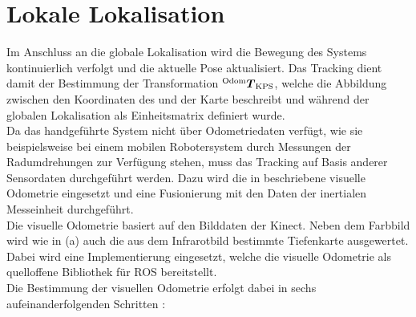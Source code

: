 \section{Lokale Lokalisation}
\label{locloc}
Im Anschluss an die globale Lokalisation wird die Bewegung des Systems kontinuierlich verfolgt und die aktuelle Pose aktualisiert. Das Tracking dient damit der Bestimmung der Transformation ${^{\mathrm{Odom}}\mbox{\boldmath{$T$}}_{\mathrm{KPS}}}$, welche die Abbildung zwischen den Koordinaten des  und der Karte beschreibt und während der globalen Lokalisation als Einheitsmatrix definiert wurde.\\

Da das handgeführte System nicht über Odometriedaten verfügt, wie sie beispielsweise bei einem mobilen Robotersystem durch Messungen der Radumdrehungen zur Verfügung stehen, muss das Tracking auf Basis anderer Sensordaten durchgeführt werden. Dazu wird die in  beschriebene visuelle Odometrie eingesetzt und eine Fusionierung mit den Daten der inertialen Messeinheit durchgeführt.\\

Die visuelle Odometrie basiert auf den Bilddaten der Kinect. Neben dem Farbbild wird wie in  (a) auch die aus dem Infrarotbild bestimmte Tiefenkarte ausgewertet. Dabei wird eine Implementierung \cite{Fovis} eingesetzt, welche die visuelle Odometrie als quelloffene Bibliothek für ROS bereitstellt.\\
Die Bestimmung der visuellen Odometrie erfolgt dabei in sechs aufeinanderfolgenden Schritten \cite{Huang2011}:

